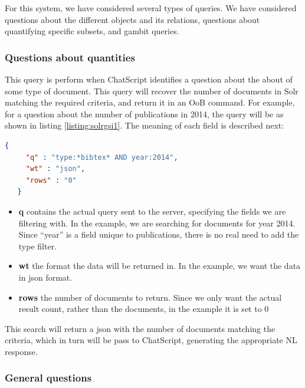 For this system, we have considered several types of queries. We have considered questions about the different objects and its relations, questions about quantifying specific subsets, and gambit queries. 

\subsubsection{Questions about quantities}

This query is perform when ChatScript identifies a question about the about of some type of document. This query will recover the number of documents in Solr matching the required criteria, and return it in an \ac{OoB} command. For example, for a question about the number of publications in 2014, the query will be as shown in listing \ref{listing:solrgsi1}. The meaning of each field is described next:

\begin{center} 
  \begin{lstlisting}[language=json, caption=Example json query for Solr, label=listing:solrgsi1]
   {
     "q" : "type:*bibtex* AND year:2014",
     "wt" : "json",
     "rows" : "0"
   }  
  \end{lstlisting}
\end{center}

\begin{itemize}
  \item \textbf{q} contains the actual query sent to the server, specifying the fields we are filtering with. In the example, we are searching for documents for year 2014. Since ``year'' is a field unique to publications, there is no real need to add the type filter.
  \item \textbf{wt} the format the data will be returned in. In the example, we want the data in json format.
  \item \textbf{rows} the number of documents to return. Since we only want the actual result count, rather than the documents, in the example it is set to 0
\end{itemize}

This search will return a json with the number of documents matching the criteria, which in turn will be pass to ChatScript, generating the appropriate \ac{NL} response.

\subsubsection{General questions}

